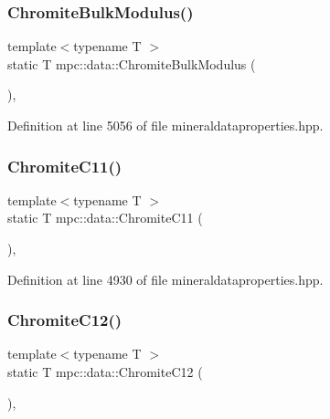 \subsubsection{\texorpdfstring{Chromite\+Bulk\+Modulus()}{ChromiteBulkModulus()}}
{\footnotesize\ttfamily template$<$typename T $>$ \\
static T mpc\+::data\+::\+Chromite\+Bulk\+Modulus (\begin{DoxyParamCaption}{ }\end{DoxyParamCaption})\hspace{0.3cm}{\ttfamily [inline]}, {\ttfamily [static]}}



Definition at line 5056 of file mineraldataproperties.\+hpp.

\mbox{\label{namespacempc_1_1data_a772db0b688f3ab098f19c1d793d0916e}} 
\subsubsection{\texorpdfstring{Chromite\+C11()}{ChromiteC11()}}
{\footnotesize\ttfamily template$<$typename T $>$ \\
static T mpc\+::data\+::\+Chromite\+C11 (\begin{DoxyParamCaption}{ }\end{DoxyParamCaption})\hspace{0.3cm}{\ttfamily [inline]}, {\ttfamily [static]}}



Definition at line 4930 of file mineraldataproperties.\+hpp.

\mbox{\label{namespacempc_1_1data_aca6cedc684c7f451a3a1f11232dc46df}} 
\subsubsection{\texorpdfstring{Chromite\+C12()}{ChromiteC12()}}
{\footnotesize\ttfamily template$<$typename T $>$ \\
static T mpc\+::data\+::\+Chromite\+C12 (\begin{DoxyParamCaption}{ }\end{DoxyParamCaption})\hspace{0.3cm}{\ttfamily [inline]}, {\ttfamily [static]}}



